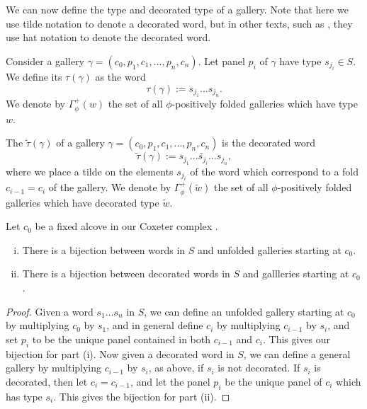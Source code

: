 \documentclass[11pt]{article}
\begin{document}
We can now define the type and decorated type of a gallery. Note that here we use tilde notation to denote a decorated word, but in other texts, such as \cite{SHA}, they use hat notation to denote the decorated word.

\begin{definition}
    Consider a gallery $\gamma = (c_0,p_1,c_1,...,p_n,c_n)$. Let panel $p_i$ of $\gamma$ have type $s_{j_i}\in S$. We define its  $\tau(\gamma)$ as the word 
    \[\tau(\gamma):=s_{j_1}...s_{j_n}.\]
    We denote by $\Gamma_{\phi}^+(w)$ the set of all $\phi$-positively folded galleries which have type $w$. 
\end{definition}

\begin{definition}
    The  $\tilde\tau(\gamma)$ of a gallery $\gamma = (c_0,p_1,c_1,...,p_n,c_n)$ is the decorated word
    \[\tilde\tau(\gamma):= s_{j_1}...\tilde{s_{j_i}}...s_{j_n},\]
    where we place a tilde on the elements $s_{j_i}$ of the word which correspond to a fold $c_{i-1}=c_i$ of the gallery. We denote by $\Gamma_{\phi}^+(\tilde{w})$ the set of all $\phi$-positively folded galleries which have decorated type $\tilde{w}$.
\end{definition}


\begin{lemma}\cite[p.128]{SHA}
    Let $c_0$ be a fixed alcove in our Coxeter complex \sg. 
    \begin{enumerate}[(i)]
        \item There is a bijection between words in $S$ and unfolded galleries starting at $c_0$.
        \item There is a bijection between decorated words in $S$ and gallleries starting at $c_0$. 
    \end{enumerate}
\end{lemma}

\begin{proof}
    Given a word $s_1\hdots s_n$ in $S$, we can define an unfolded gallery starting at $c_0$ by multiplying $c_0$ by $s_1$, and in general define $c_i$ by multiplying $c_{i-1}$ by $s_{i}$, and set $p_i$ to be the unique panel contained in both $c_{i-1}$ and $c_i$. This gives our bijection for part (i). 
    Now given a decorated word in $S$, we can define a general gallery by multiplying $c_{i-1}$ by $s_{i}$, as above, if $s_{i}$ is not decorated. If $s_{i}$ is decorated, then let $c_i=c_{i-1}$, and let the panel $p_i$ be the unique panel of $c_i$ which has type $s_i$. This gives the bijection for part (ii). 
\end{proof}
\end{document}
